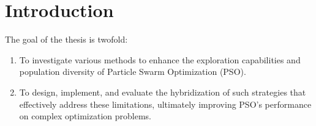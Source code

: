 \chapter{Introduction}
\label{cp:introduction}

{



The goal of the thesis is twofold: 
\begin{enumerate}
    \item To investigate various methods to enhance the exploration capabilities and population diversity of Particle Swarm Optimization (PSO).
    \item To design, implement, and evaluate the hybridization of such strategies that effectively address these limitations, ultimately improving PSO’s performance on complex optimization problems.
\end{enumerate}





}
